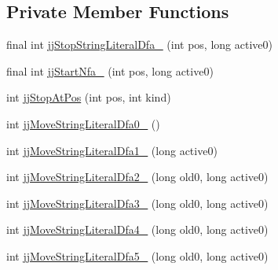 \subsection*{Private Member Functions}
\begin{DoxyCompactItemize}
\item 
final int \hyperlink{classuk_1_1ac_1_1manchester_1_1cs_1_1owl_1_1owlapi_1_1turtle_1_1parser_1_1_turtle_parser_token_manager_a759d98aacf4f47b6d6897d84c766fa3a}{jj\-Stop\-String\-Literal\-Dfa\-\_} (int pos, long active0)
\item 
final int \hyperlink{classuk_1_1ac_1_1manchester_1_1cs_1_1owl_1_1owlapi_1_1turtle_1_1parser_1_1_turtle_parser_token_manager_aa0c761f1cfe54d0bf54698bf7704c467}{jj\-Start\-Nfa\-\_} (int pos, long active0)
\item 
int \hyperlink{classuk_1_1ac_1_1manchester_1_1cs_1_1owl_1_1owlapi_1_1turtle_1_1parser_1_1_turtle_parser_token_manager_aee214f6682bd6d5215d39de8952a29be}{jj\-Stop\-At\-Pos} (int pos, int kind)
\item 
int \hyperlink{classuk_1_1ac_1_1manchester_1_1cs_1_1owl_1_1owlapi_1_1turtle_1_1parser_1_1_turtle_parser_token_manager_af319ce7b51c3c16e8724a016eeeb9980}{jj\-Move\-String\-Literal\-Dfa0\-\_} ()
\item 
int \hyperlink{classuk_1_1ac_1_1manchester_1_1cs_1_1owl_1_1owlapi_1_1turtle_1_1parser_1_1_turtle_parser_token_manager_ac87e5be2a4c99a29f4f626dc660fe128}{jj\-Move\-String\-Literal\-Dfa1\-\_} (long active0)
\item 
int \hyperlink{classuk_1_1ac_1_1manchester_1_1cs_1_1owl_1_1owlapi_1_1turtle_1_1parser_1_1_turtle_parser_token_manager_a70280c3239fa09c1020d4906c733b235}{jj\-Move\-String\-Literal\-Dfa2\-\_} (long old0, long active0)
\item 
int \hyperlink{classuk_1_1ac_1_1manchester_1_1cs_1_1owl_1_1owlapi_1_1turtle_1_1parser_1_1_turtle_parser_token_manager_a8d7476a828915d08e8eb8db07c7e0384}{jj\-Move\-String\-Literal\-Dfa3\-\_} (long old0, long active0)
\item 
int \hyperlink{classuk_1_1ac_1_1manchester_1_1cs_1_1owl_1_1owlapi_1_1turtle_1_1parser_1_1_turtle_parser_token_manager_ab928db9fecea1dc67ea098e35c0a4e50}{jj\-Move\-String\-Literal\-Dfa4\-\_} (long old0, long active0)
\item 
int \hyperlink{classuk_1_1ac_1_1manchester_1_1cs_1_1owl_1_1owlapi_1_1turtle_1_1parser_1_1_turtle_parser_token_manager_a9656054a9b311e39c8f679edbe08015d}{jj\-Move\-String\-Literal\-Dfa5\-\_} (long old0, long active0)
\item 

\end{DoxyCompactItemize}
